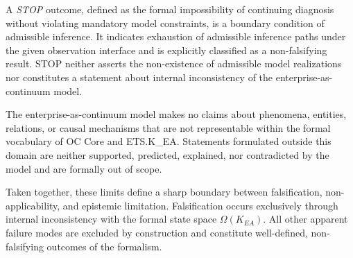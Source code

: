 \medskip

\begin{nonclaim}
A \emph{STOP} outcome, defined as the formal impossibility of continuing
diagnosis without violating mandatory model constraints, is a boundary
condition of admissible inference.
It indicates exhaustion of admissible inference paths under the given
observation interface and is explicitly classified as a non-falsifying
result.
STOP neither asserts the non-existence of admissible model realizations nor
constitutes a statement about internal inconsistency of the
enterprise-as-continuum model.
\end{nonclaim}

\medskip

\begin{nonclaim}
The enterprise-as-continuum model makes no claims about phenomena,
entities, relations, or causal mechanisms that are not representable
within the formal vocabulary of OC Core and ETS.K\_EA.
Statements formulated outside this domain are neither supported,
predicted, explained, nor contradicted by the model and are formally out
of scope.
\end{nonclaim}

\medskip

\begin{remark}
Taken together, these limits define a sharp boundary between
falsification, non-applicability, and epistemic limitation.
Falsification occurs exclusively through internal inconsistency with the
formal state space \(\Omega(K_{EA})\).
All other apparent failure modes are excluded by construction and
constitute well-defined, non-falsifying outcomes of the formalism.
\end{remark}
